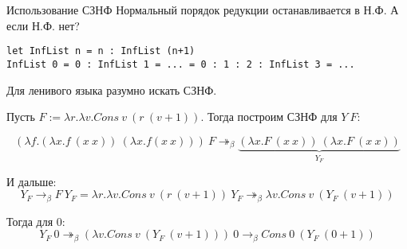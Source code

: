 \documentclass[aspectratio=169]{beamer}
\begin{document}
\begin{frame}[fragile]{Использование СЗНФ}
Нормальный порядок редукции останавливается в Н.Ф. А если Н.Ф. нет?

\begin{verbatim}let InfList n = n : InfList (n+1)
InfList 0 = 0 : InfList 1 = ... = 0 : 1 : 2 : InfList 3 = ...\end{verbatim}

Для ленивого языка разумно искать СЗНФ.

Пусть $F := \lambda r.\lambda v.Cons\ v\ (r\ (v+1))$.
Тогда построим СЗНФ для $Y\ F$:


$$(\lambda f.(\lambda x.f\ (x\ x))\ (\lambda x.f (x\ x)))\ F \twoheadrightarrow_\beta \underbrace{(\lambda x.F\ (x\ x))\ (\lambda x.F\ (x\ x))}_{Y_F}$$

И дальше:
\vspace{-0.3cm}
$$Y_F \rightarrow_\beta F\ Y_F = \lambda r.\lambda v.Cons\ v\ (r\ (v+1))\ Y_F \twoheadrightarrow_\beta \lambda v.Cons\ v\ (Y_F\ (v+1))$$

Тогда для 0:
\vspace{-0.3cm}
$$Y_F\ 0 \twoheadrightarrow_\beta (\lambda v.Cons\ v\ (Y_F\ (v+1)))\ 0 \rightarrow_\beta Cons\ 0\ (Y_F\ (0+1))$$

\begin{comment}
\begin{dfn}Лямбда-выражение $A$ находится в нормальной форме, если в нём нет редексов\end{dfn}
Например: $x\ (\lambda f.\lambda x.f\ (f\ x))\ (\lambda f.\lambda x.f\ x)$
\begin{dfn}Лямбда-выражение $A$ находится в слабой нормальной форме (Weak Normal Form), если в ней нет редексов вне тел лямбда-абстракций\end{dfn}
Например: $x\ (\lambda x.I\ I)\ (\lambda y.I\ I)$
\begin{dfn}Лямбда-выражение $A$ находится в слабой заголовочной нормальной форме (Weak Head Normal Form), если оно соответствует одному из следующих шаблонов:
\begin{itemize}
\item $x$ (является переменной)
\item $\lambda x.P$ (является лямбда-абстракцией)
\item $x\ P_1\ P_2 \dots P_n$ (является применением переменной к произвольным аргументам)
\end{itemize}\end{dfn}
Например: $x\ (I\ I)\ (I\ I)$
\end{comment}
\end{frame}
\end{document}

